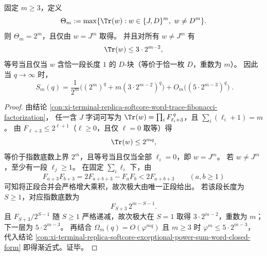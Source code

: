 \begin{conclusion}\label{con:xi-terminal-replica-softcore-tunneling-channel-dominance}
固定 \(m\ge 3\)，定义
\[
\Theta_m:=\max\{\Tr(w):w\in\{J,D\}^m,\ w\neq D^m\}.
\]
则 \(\Theta_m=2^m\)，且仅由 \(w=J^m\) 取得。
并且对所有 \(w\neq J^m\) 有
\[
\Tr(w)\le 3\cdot2^{m-2},
\]
等号当且仅当 \(w\) 含恰一段长度 \(1\) 的 \(D\)-块（等价于恰一枚 \(D\)，重数为 \(m\)）。
因此当 \(q\to\infty\) 时，
\[
\boxed{\;
S_m(q)=\frac1{2^m}\Big((2^m)^q+m(3\cdot2^{m-2})^q\Big)
+O_m\!\big((5\cdot2^{m-3})^q\big)\; }.
\]
\end{conclusion}
\begin{proof}
由结论 \ref{con:xi-terminal-replica-softcore-word-trace-fibonacci-factorization}，
任一含 \(J\) 字词可写为
\(
\Tr(w)=\prod_i F_{\ell_i+3}^{\,q}
\)，且 \(\sum_i(\ell_i+1)=m\)。
由 \(F_{\ell+3}\le 2^{\ell+1}\)（\(\ell\ge0\)，且仅 \(\ell=0\) 取等）得
\[
\Tr(w)\le 2^{mq},
\]
等价于指数底数上界 \(2^m\)，且等号当且仅当全部 \(\ell_i=0\)，即 \(w=J^m\)。
若 \(w\neq J^m\)，至少有一段 \(\ell_j\ge1\)。
在固定 \(\sum_i\ell_i\) 下，由
\[
F_{a+3}F_{b+3}=2F_{a+b+3}-F_aF_b<2F_{a+b+3}\qquad(a,b\ge1)
\]
可知将正段合并会严格增大乘积，故次极大由唯一正段给出。
若该段长度为 \(S\ge1\)，对应指数底数为
\[
F_{S+3}\,2^{m-S-1}.
\]
且 \(F_{S+3}/2^{S-1}\) 随 \(S\ge1\) 严格递减，故次极大在 \(S=1\) 取得
\(3\cdot2^{m-2}\)，重数为 \(m\)；下一层为 \(5\cdot2^{m-3}\)。
再结合 \(\Omega_m(q)=O(\varphi^{mq})\) 且 \(m\ge3\) 时 \(\varphi^m\le 5\cdot2^{m-3}\)，
代入结论 \ref{con:xi-terminal-replica-softcore-exceptional-power-sum-word-closed-form}
即得渐近式。证毕。
\end{proof}
